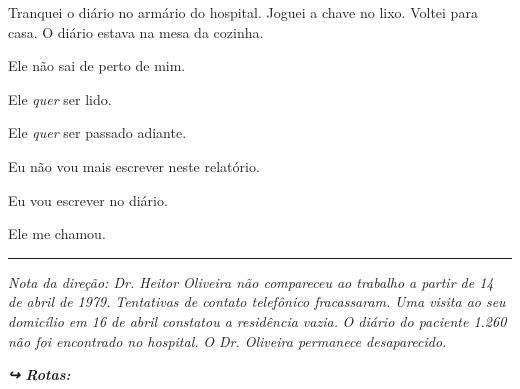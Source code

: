 \noindent Tranquei o diário no armário do hospital.
Joguei a chave no lixo.
Voltei para casa.
O diário estava na mesa da cozinha.

\noindent Ele não sai de perto de mim.

\noindent Ele \textit{quer} ser lido.

\noindent Ele \textit{quer} ser passado adiante.

\noindent Eu não vou mais escrever neste relatório.

\noindent Eu vou escrever no diário.

\noindent Ele me chamou.

\vspace{0.5em}\noindent\rule{\textwidth}{0.5pt}\vspace{0.5em}

\noindent \textit{Nota da direção: Dr. Heitor Oliveira não compareceu ao trabalho a partir de 14 de abril de 1979.}
\textit{Tentativas de contato telefônico fracassaram.}
\textit{Uma visita ao seu domicílio em 16 de abril constatou a residência vazia.}
\textit{O diário do paciente 1.260 não foi encontrado no hospital.}
\textit{O Dr. Oliveira permanece desaparecido.}

\vspace{0.5em}
\noindent\textit{\textbf{↪ Rotas:}  \rotasep {}}